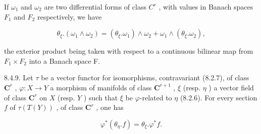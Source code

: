 If \(\omega_{1}\) and \(\omega_{2}\) are two differential forms of class \(C^{r}\) , with values in Banach spaces \(F_{1}\) and \(F_{2}\) respectively, we have

\[
\theta_ {\xi}. (\omega_ {1} \wedge \omega_ {2}) = (\theta_ {\xi}. \omega_ {1}) \wedge \omega_ {2} + \omega_ {1} \wedge (\theta_ {\xi}. \omega_ {2}),\tag{8}
\]

the exterior product being taken with respect to a continuous bilinear map from \(F_{1} \times F_{2}\) into a Banach space F.

8.4.9. Let \(\tau\) be a vector functor for isomorphisms, contravariant (8.2.7), of class \(\mathbf{C}^r\) , \(\varphi: X \to Y\) a morphism of manifolds of class \(\mathbf{C}^{r+1}\) , \(\xi\) (resp. \(\eta\) ) a vector field of class \(\mathbf{C}^r\) on \(X\) (resp. \(Y\) ) such that \(\xi\) be \(\varphi\)-related to \(\eta\) (8.2.6). For every section \(f\) of \(\tau(T(Y))\) , of class \(\mathbf{C}^r\) , one has

\[
\varphi^ {*} (\theta_ {\eta}. f) = \theta_ {\xi}. \varphi^ {*} f.
\]

